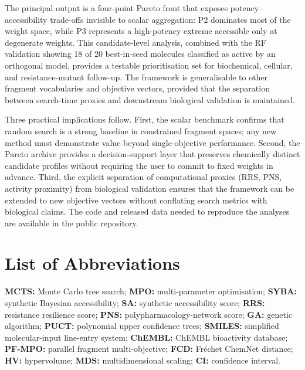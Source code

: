 \documentclass[10pt,a4paper]{article}
\begin{document}
The principal output is a four-point Pareto front that exposes potency--accessibility trade-offs invisible to scalar aggregation: P2 dominates most of the weight space, while P3 represents a high-potency extreme accessible only at degenerate weights. This candidate-level analysis, combined with the RF validation showing \num{18} of \num{20} best-in-seed molecules classified as active by an orthogonal model, provides a testable prioritisation set for biochemical, cellular, and resistance-mutant follow-up. The framework is generalisable to other fragment vocabularies and objective vectors, provided that the separation between search-time proxies and downstream biological validation is maintained.

Three practical implications follow. First, the scalar benchmark confirms that random search is a strong baseline in constrained fragment spaces; any new method must demonstrate value beyond single-objective performance. Second, the Pareto archive provides a decision-support layer that preserves chemically distinct candidate profiles without requiring the user to commit to fixed weights in advance. Third, the explicit separation of computational proxies (RRS, PNS, activity proximity) from biological validation ensures that the framework can be extended to new objective vectors without conflating search metrics with biological claims. The code and released data needed to reproduce the analyses are available in the public repository.

\section*{List of Abbreviations}

\textbf{MCTS:} Monte Carlo tree search; \textbf{MPO:} multi-parameter optimisation; \textbf{SYBA:} synthetic Bayesian accessibility; \textbf{SA:} synthetic accessibility score; \textbf{RRS:} resistance resilience score; \textbf{PNS:} polypharmacology-network score; \textbf{GA:} genetic algorithm; \textbf{PUCT:} polynomial upper confidence trees; \textbf{SMILES:} simplified molecular-input line-entry system; \textbf{ChEMBL:} ChEMBL bioactivity database; \textbf{PF-MPO:} parallel fragment multi-objective; \textbf{FCD:} Fr\'echet ChemNet distance; \textbf{HV:} hypervolume; \textbf{MDS:} multidimensional scaling; \textbf{CI:} confidence interval.
\end{document}
